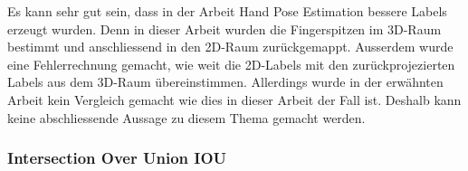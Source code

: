 Es kann sehr gut sein, dass in der Arbeit \grqq{}Hand Pose Estimation\grqq{} \cite{HandPoseEstimation} bessere Labels erzeugt wurden.
Denn in dieser Arbeit\cite{HandPoseEstimation} wurden die Fingerspitzen im 3D-Raum bestimmt und anschliessend in den 2D-Raum zurückgemappt.
Ausserdem wurde eine Fehlerrechnung gemacht, wie weit die 2D-Labels mit den zurückprojezierten Labels aus dem 3D-Raum übereinstimmen. 
Allerdings wurde in der erwähnten Arbeit\cite{HandPoseEstimation} kein Vergleich gemacht wie dies in dieser Arbeit der Fall ist.
Deshalb kann keine abschliessende Aussage zu diesem Thema gemacht werden.

\subsubsection{Intersection Over Union IOU}
